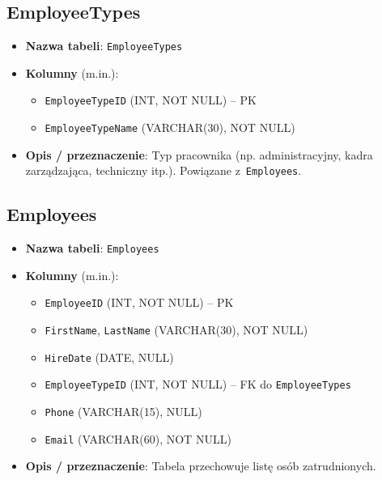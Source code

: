 \documentclass[12pt]{article}
\begin{document}
\subsection{EmployeeTypes}
\begin{itemize}
    \item \textbf{Nazwa tabeli}: \texttt{EmployeeTypes}
    \item \textbf{Kolumny} (m.in.):
          \begin{itemize}
            \item \texttt{EmployeeTypeID} (INT, NOT NULL) -- PK
            \item \texttt{EmployeeTypeName} (VARCHAR(30), NOT NULL)
          \end{itemize}
    \item \textbf{Opis / przeznaczenie}:  
          Typ pracownika (np. administracyjny, kadra zarządzająca, techniczny itp.).  
          Powiązane z~\texttt{Employees}.
\end{itemize}

\subsection{Employees}
\begin{itemize}
    \item \textbf{Nazwa tabeli}: \texttt{Employees}
    \item \textbf{Kolumny} (m.in.):
          \begin{itemize}
            \item \texttt{EmployeeID} (INT, NOT NULL) -- PK
            \item \texttt{FirstName}, \texttt{LastName} (VARCHAR(30), NOT NULL)
            \item \texttt{HireDate} (DATE, NULL)
            \item \texttt{EmployeeTypeID} (INT, NOT NULL) -- FK do \texttt{EmployeeTypes}
            \item \texttt{Phone} (VARCHAR(15), NULL)
            \item \texttt{Email} (VARCHAR(60), NOT NULL)
          \end{itemize}
    \item \textbf{Opis / przeznaczenie}:  
          Tabela przechowuje listę osób zatrudnionych.
\end{itemize}
\end{document}
